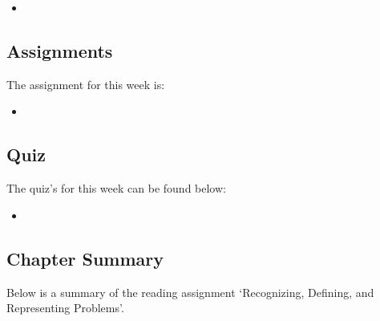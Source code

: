 \begin{itemize}
    \item {}
\end{itemize}

\subsection{Assignments}

The assignment for this week is:

\begin{itemize}
    \item {}
\end{itemize}

\subsection{Quiz}

The quiz's for this week can be found below:

\begin{itemize}
    \item {}
\end{itemize}

\subsection{Chapter Summary}

Below is a summary of the reading assignment `Recognizing, Defining, and Representing Problems'.

